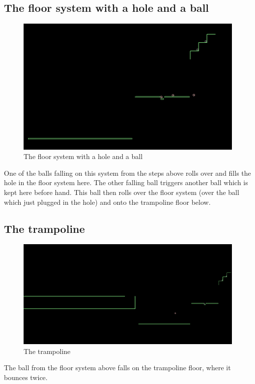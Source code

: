\documentclass[a4paper,11pt]{article}
\begin{document}
  \subsection{The floor system with a hole and a ball}
	\begin{figure}
	\includegraphics[scale=0.35]{16_impact_with_elastic_ball.png}
	\caption{The floor system with a hole and a ball}
	\end{figure}  
 	One of the balls falling on this system from the steps above rolls over and fills the hole in the floor system here. The other falling ball triggers another ball which is kept here before hand. This ball then rolls over the floor system (over the ball which just plugged in the hole) and onto the trampoline floor below.

\subsection{The trampoline}
  	\begin{figure}
	\includegraphics[scale=0.35]{17_bouncing_on_trampoline.png}
	\caption{The trampoline}
	\end{figure}  
	The ball from the floor system above falls on the trampoline floor, where it bounces twice.
\end{document}
